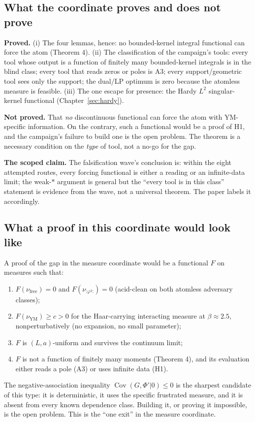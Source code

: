 \subsection{What the coordinate proves and does not prove}

\textbf{Proved.} (i) The four lemmas, hence: no bounded-kernel integral functional can force the
atom (Theorem 4). (ii) The classification of the campaign's tools: every tool whose output is a
function of finitely many bounded-kernel integrals is in the blind class; every tool that reads
zeros or poles is A3; every support/geometric tool sees only the support; the dual/LP optimum is
zero because the atomless measure is feasible. (iii) The one escape for presence: the Hardy
$L^2$ singular-kernel functional (Chapter~\ref{sec:hardy}).

\textbf{Not proved.} That \emph{no} discontinuous functional can force the atom with YM-specific
information. On the contrary, such a functional would be a proof of H1, and the campaign's
failure to build one is the open problem. The theorem is a necessary condition on the \emph{type}
of tool, not a no-go for the gap.

\textbf{The scoped claim.} The falsification wave's conclusion is: within the eight attempted
routes, every forcing functional is either a reading or an infinite-data limit; the weak-$*$
argument is general but the ``every tool is in this class'' statement is evidence from the wave,
not a universal theorem. The paper labels it accordingly.

\subsection{What a proof in this coordinate would look like}

A proof of the gap in the measure coordinate would be a functional $F$ on measures such that:
\begin{enumerate}
\item $F(\nu_{\text{free}})=0$ and $F(\nu_{\mathord{:}\varphi^2\mathord{:}})=0$ (acid-clean on
  both atomless adversary classes);
\item $F(\nu_{\text{YM}})\ge c>0$ for the Haar-carrying interacting measure at $\beta\approx2.5$,
  nonperturbatively (no expansion, no small parameter);
\item $F$ is $(L,a)$-uniform and survives the continuum limit;
\item $F$ is not a function of finitely many moments (Theorem 4), and its evaluation either
  reads a pole (A3) or uses infinite data (H1).
\end{enumerate}
The negative-association inequality $\operatorname{Cov}(G,\Phi'|0)\le0$ is the sharpest candidate
of this type: it is deterministic, it uses the specific frustrated measure, and it is absent from
every known dependence class. Building it, or proving it impossible, is the open problem. This is
the ``one exit'' in the measure coordinate.

